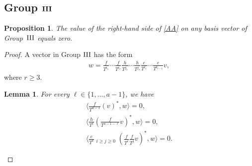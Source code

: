 \documentclass[pdftex]{sigma}
\numberwithin{equation}{section}
\newtheorem{lem}[thm]{Lemma}
\newtheorem{prop}[thm]{Proposition}
{\theoremstyle{definition}
\newtheorem*{rem}{Remark}}
\begin{document}
\subsection[Group ${\rm III}$]{Group $\boldsymbol{{\rm III}}$}
\begin{prop}\label{Pr1}The value of the right-hand side of \eqref{AA} on any basis vector of Group~${\rm III}$ equals zero.
\end{prop}
\begin{proof}A vector in Group ${\rm III}$ has the form
\begin{gather*}
w= \frac{f}{T^{i_1}}\cdots\frac{f}{T^{i_r}}
\frac{h}{T^{j_1}}\cdots\frac{h}{T^{j_s}}
\frac{e}{T^{l_1}}\cdots\frac{e}{T^{l_{r-1}}}v,
\end{gather*}
where $r \geq 3$.

\begin{lem}\label{Group 1}For every $\ell \in \{1, \dots, a-1 \}$, we have
\begin{gather}
\bigg\langle \frac{f}{T^{a-1}} (v)^*, w \bigg\rangle =0, \label{G31} \\
\bigg\langle \frac{h}{T^{\ell}} \left(\frac{f}{T^{a-1-\ell}}v\right)^*, w \bigg\rangle =0, \label{G32} \\
 \bigg\langle \frac{e}{T^{\ell}} \mathop{\sum_{i+j=a-1-\ell}}_{i\geq j\geq 0} \left(\frac{f}{T^i}\frac{f}{T^j}v\right)^*, w \bigg\rangle = 0. \label{G33}
\end{gather}
\end{lem}


\end{proof}
\end{document}
